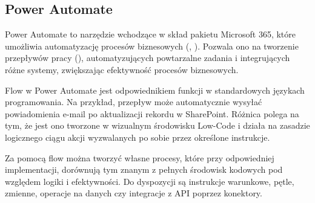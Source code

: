 \subsection{Power Automate \cite{v-aangie_official_nodate}}
Power Automate to narzędzie wchodzące w skład pakietu Microsoft 365, które umożliwia automatyzację procesów biznesowych (, ). Pozwala ono na tworzenie przepływów pracy (), automatyzujących powtarzalne zadania i integrujących różne systemy, zwiększając efektywność procesów biznesowych.

Flow w Power Automate jest odpowiednikiem funkcji w standardowych językach programowania. Na przykład, przepływ może automatycznie wysyłać powiadomienia e-mail po aktualizacji rekordu w SharePoint. Różnica polega na tym, że jest ono tworzone w wizualnym środowisku Low-Code i działa na zasadzie logicznego ciągu akcji wyzwalanych po sobie przez określone instrukcje.

Za pomocą flow można tworzyć własne procesy, które przy odpowiedniej implementacji, dorównują tym znanym z pełnych środowisk kodowych pod względem logiki i efektywności. Do dyspozycji są instrukcje warunkowe, pętle, zmienne, operacje na danych czy integracje z API poprzez konektory.
